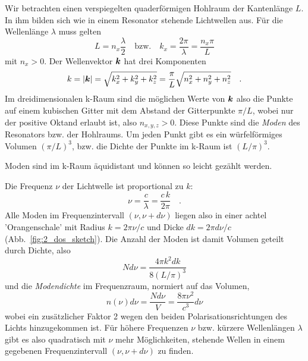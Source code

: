 Wir betrachten einen verspiegelten quaderförmigen Hohlraum der Kantenlänge $L$. In ihm bilden sich wie in einem Resonator stehende Lichtwellen aus. Für die Wellenlänge $\lambda$ muss gelten
\begin{equation}
     L = n_x \frac{\lambda}{2} \quad \text{bzw.} \quad k_x = \frac{2 \pi}{\lambda} = \frac{n_x \pi }{L}
\end{equation}
mit $n_x > 0$. Der Wellenvektor $\boldsymbol{k}$ hat drei Komponenten
\begin{equation}
    k = | \boldsymbol{k} | = \sqrt{k_x^2 + k_y^2 + k_z^2 } = \frac{\pi}{L} \sqrt{n_x^2 + n_y^2 + n_z^2} \quad .
\end{equation}
Im dreidimensionalen k-Raum sind die möglichen Werte von $\boldsymbol{k}$ also die Punkte auf einem kubischen Gitter mit dem Abstand der Gitterpunkte $\pi / L$, wobei nur der positive Oktand erlaubt ist, also $n_{x,y,z} > 0$. Diese Punkte sind die \emph{Moden} des Resonators bzw. der Hohlraums. Um jeden Punkt gibt es ein würfelförmiges Volumen $(\pi/L)^3$, bzw. die Dichte der Punkte im k-Raum ist $(L/\pi)^3$.

\begin{marginfigure}
    \caption{Moden sind im k-Raum äquidistant und können so leicht gezählt werden.}
    \label{fig:2_dos_sketch}
\end{marginfigure}

Die Frequenz $\nu$ der Lichtwelle ist proportional zu $k$:
\begin{equation}
    \nu = \frac{c}{\lambda} = \frac{c \, k}{2 \pi } \quad .
\end{equation}
Alle Moden  im  Frequenzintervall $(\nu, \nu+d\nu)$ liegen also in einer  achtel 'Orangenschale' mit Radius $k = 2 \pi \nu / c$  und Dicke $dk = 2 \pi d\nu / c$ (Abb.~\ref{fig:2_dos_sketch}). Die Anzahl der Moden ist damit Volumen geteilt durch Dichte, also  
\begin{equation}
    N d\nu = \frac{4 \pi k^2 dk}{8 (L/\pi)^3} 
\end{equation}
und die \emph{Modendichte} im Frequenzraum, normiert auf das Volumen,
\begin{equation}
    n(\nu) d\nu = \frac{N d\nu}{V} = \frac{8 \pi \nu^2}{c^3} d\nu
\end{equation}
wobei ein zusätzlicher Faktor 2 wegen den beiden Polarisationsrichtungen des Lichts hinzugekommen ist. Für höhere Frequenzen $\nu$ bzw. kürzere Wellenlängen $\lambda$ gibt es also quadratisch mit $\nu$ mehr Möglichkeiten, stehende Wellen in einem gegebenen Frequenzintervall $(\nu, \nu+d\nu)$ zu finden. 

